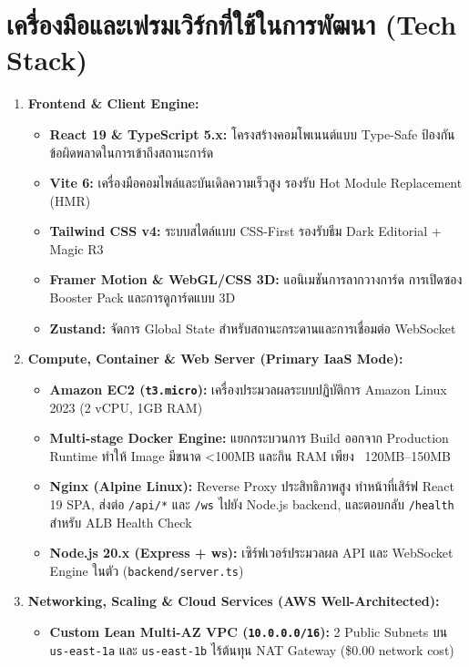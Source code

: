 \documentclass[12pt,a4paper]{report}
\begin{document}
\section{เครื่องมือและเฟรมเวิร์กที่ใช้ในการพัฒนา (Tech Stack)}
\begin{enumerate}
    \item \textbf{Frontend \& Client Engine:}
    \begin{itemize}
        \item \textbf{React 19 \& TypeScript 5.x:} โครงสร้างคอมโพเนนต์แบบ Type-Safe ป้องกันข้อผิดพลาดในการเข้าถึงสถานะการ์ด
        \item \textbf{Vite 6:} เครื่องมือคอมไพล์และบันเดิลความเร็วสูง รองรับ Hot Module Replacement (HMR)
        \item \textbf{Tailwind CSS v4:} ระบบสไตล์แบบ CSS-First รองรับธีม Dark Editorial + Magic R3
        \item \textbf{Framer Motion \& WebGL/CSS 3D:} แอนิเมชันการลากวางการ์ด การเปิดซอง Booster Pack และการดูการ์ดแบบ 3D
        \item \textbf{Zustand:} จัดการ Global State สำหรับสถานะกระดานและการเชื่อมต่อ WebSocket
    \end{itemize}
    \item \textbf{Compute, Container \& Web Server (Primary IaaS Mode):}
    \begin{itemize}
        \item \textbf{Amazon EC2 (\texttt{t3.micro}):} เครื่องประมวลผลระบบปฏิบัติการ Amazon Linux 2023 (2 vCPU, 1GB RAM)
        \item \textbf{Multi-stage Docker Engine:} แยกกระบวนการ Build ออกจาก Production Runtime ทำให้ Image มีขนาด <100MB และกิน RAM เพียง ~120MB--150MB
        \item \textbf{Nginx (Alpine Linux):} Reverse Proxy ประสิทธิภาพสูง ทำหน้าที่เสิร์ฟ React 19 SPA, ส่งต่อ \texttt{/api/*} และ \texttt{/ws} ไปยัง Node.js backend, และตอบกลับ \texttt{/health} สำหรับ ALB Health Check
        \item \textbf{Node.js 20.x (Express + ws):} เซิร์ฟเวอร์ประมวลผล API และ WebSocket Engine ในตัว (\texttt{backend/server.ts})
    \end{itemize}
    \item \textbf{Networking, Scaling \& Cloud Services (AWS Well-Architected):}
    \begin{itemize}
        \item \textbf{Custom Lean Multi-AZ VPC (\texttt{10.0.0.0/16}):} 2 Public Subnets บน \texttt{us-east-1a} และ \texttt{us-east-1b} ไร้ต้นทุน NAT Gateway (\$0.00 network cost)

\end{itemize}
\end{enumerate}
\end{document}
